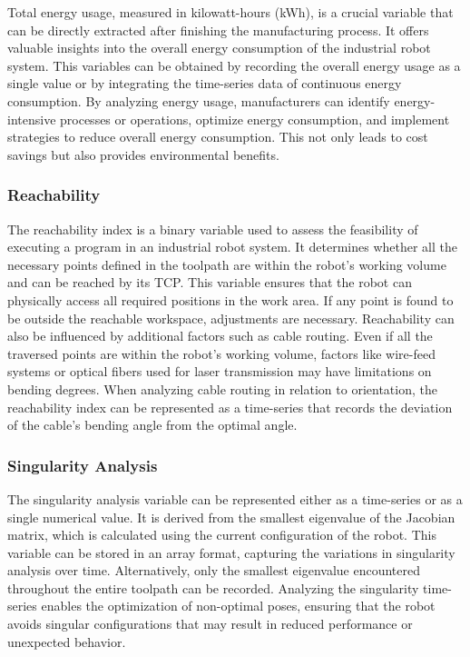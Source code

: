 \documentclass[conference]{IEEEtran}
\begin{document}
Total energy usage, measured in kilowatt-hours (kWh), is a crucial variable that can be directly extracted after finishing the manufacturing process. It offers valuable insights into the overall energy consumption of the industrial robot system. This variables can be obtained by recording the overall energy usage as a single value or by integrating the time-series data of continuous energy consumption. By analyzing energy usage, manufacturers can identify energy-intensive processes or operations, optimize energy consumption, and implement strategies to reduce overall energy consumption. This not only leads to cost savings but also provides environmental benefits.



\subsubsection*{Reachability}
The reachability index is a binary variable used to assess the feasibility of executing a program in an industrial robot system. It determines whether all the necessary points defined in the toolpath are within the robot's working volume and can be reached by its TCP. This variable ensures that the robot can physically access all required positions in the work area. If any point is found to be outside the reachable workspace, adjustments are necessary. Reachability can also be influenced by additional factors such as cable routing. Even if all the traversed points are within the robot's working volume, factors like wire-feed systems or optical fibers used for laser transmission may have limitations on bending degrees. When analyzing cable routing in relation to orientation, the reachability index can be represented as a time-series that records the deviation of the cable's bending angle from the optimal angle.

\subsubsection*{Singularity Analysis}
The singularity analysis variable can be represented either as a time-series or as a single numerical value. It is derived from the smallest eigenvalue of the Jacobian matrix, which is calculated using the current configuration of the robot. This variable can be stored in an array format, capturing the variations in singularity analysis over time. Alternatively, only the smallest eigenvalue encountered throughout the entire toolpath can be recorded. Analyzing the singularity time-series enables the optimization of non-optimal poses, ensuring that the robot avoids singular configurations that may result in reduced performance or unexpected behavior.
\end{document}
